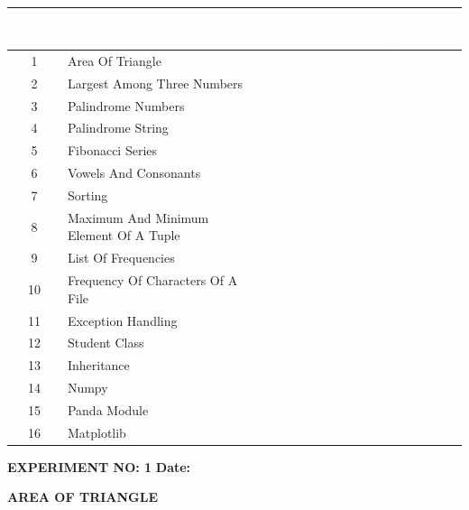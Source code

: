 \documentclass[11pt,a4paper]{article}
\begin{document}
\begin{table}[h!]
\centering
\begin{tabular}{|c|p{7.5cm}|c|c|c|}
\hline
\rowcolor{navyblue}
\textcolor{white}{\textbf{Exp No.}} & \textcolor{white}{\textbf{Name of Experiment}} & \textcolor{white}{\textbf{Date}} & \textcolor{white}{\textbf{Page No.}} & \textcolor{white}{\textbf{Faculty Signature}} \\
\hline
1 & Area Of Triangle & & & \\ \hline
\rowcolor{navyblue!5}
2 & Largest Among Three Numbers & & & \\ \hline
3 & Palindrome Numbers & & & \\ \hline
\rowcolor{navyblue!5}
4 & Palindrome String & & & \\ \hline
5 & Fibonacci Series & & & \\ \hline
\rowcolor{navyblue!5}
6 & Vowels And Consonants & & & \\ \hline
7 & Sorting & & & \\ \hline
\rowcolor{navyblue!5}
8 & Maximum And Minimum Element Of A Tuple & & & \\ \hline
9 & List Of Frequencies & & & \\ \hline
\rowcolor{navyblue!5}
10 & Frequency Of Characters Of A File & & & \\ \hline
11 & Exception Handling & & & \\ \hline
\rowcolor{navyblue!5}
12 & Student Class & & & \\ \hline
13 & Inheritance & & & \\ \hline
\rowcolor{navyblue!5}
14 & Numpy & & & \\ \hline
15 & Panda Module & & & \\ \hline
\rowcolor{navyblue!5}
16 & Matplotlib & & & \\ \hline
\end{tabular}
\end{table}

\newpage
\noindent
\textbf{\large EXPERIMENT NO: 1} \hfill \textbf{\large Date: \underline{\hspace{3cm}}}

\vspace{0.2cm}
\begin{center}
{\Huge \textbf{\textcolor{navyblue}{AREA OF TRIANGLE}}}
\end{center}
\vspace{0.3cm}
\end{document}
